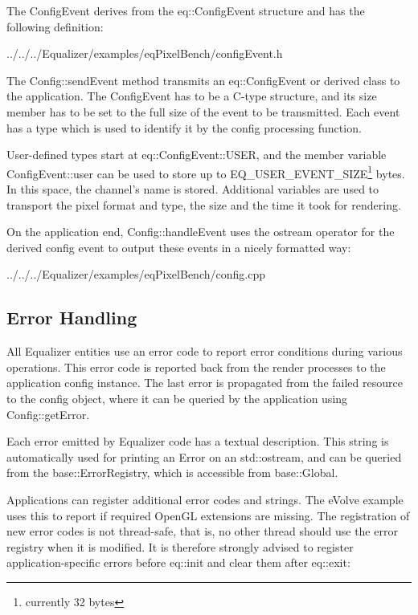 \documentclass[10pt,a4]{scrartcl}
\begin{document}
The \textsf{ConfigEvent} derives from the \textsf{eq::ConfigEvent}
structure and has the following definition:

{\footnotesize
  {../../../Equalizer/examples/eqPixelBench/configEvent.h}}


The \textsf{Config::sendEvent} method transmits an
\textsf{eq::ConfigEvent} or derived class to the application. The
ConfigEvent has to be a C-type structure, and its \textsf{size}
member has to be set to the full size of the event to be transmitted.
Each event has a type which is used to identify it by the config 
processing function.

User-defined types start at \textsf{eq::ConfigEvent::USER}, and the
member variable \textsf{ConfigEvent::user} can be used to store up to
\textsf{EQ\_USER\_EVENT\_SIZE}\footnote{currently 32 bytes} bytes. In
this space, the channel's name is stored. Additional variables are used
to transport the pixel format and type, the size and the time it took
for rendering.

On the application end, \textsf{Config::handleEvent} uses the
\textsf{ostream} operator for the derived config event to output these
events in a nicely formatted way:

{\footnotesize
  {../../../Equalizer/examples/eqPixelBench/config.cpp}}


\subsection{\label{sErrorHandling}Error Handling}

All Equalizer entities use an error code to report error conditions during
various operations. This error code is reported back from the render processes
to the application config instance. The last error is propagated from the failed
resource to the config object, where it can be queried by the application using
\textsf{Config::getError}.

Each error emitted by Equalizer code has a textual description. This string is
automatically used for printing an \textsf{Error} on an \textsf{std::ostream},
and can be queried from the \textsf{base::ErrorRegistry}, which is accessible
from \textsf{base::Global}.

Applications can register additional error codes and strings. The
\textsf{eVolve} example uses this to report if required OpenGL extensions are
missing. The registration of new error codes is not thread-safe, that is, no
other thread should use the error registry when it is modified. It is therefore
strongly advised to register application-specific errors before
\textsf{eq::init} and clear them after \textsf{eq::exit}:
\end{document}
